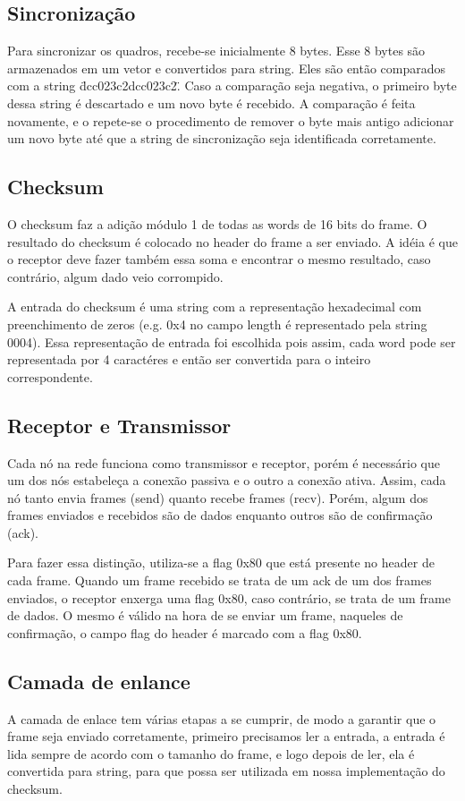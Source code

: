 \documentclass[a4paper,10pt]{article}
\begin{document}
\subsection{Sincronização}
  Para sincronizar os quadros, recebe-se inicialmente 8 bytes. Esse 8 bytes
  são armazenados em um vetor e convertidos para string. Eles são então
  comparados com a string \"dcc023c2dcc023c2\". Caso a comparação seja
  negativa, o primeiro byte dessa string é descartado e um novo byte é
  recebido. A comparação é feita novamente, e o repete-se o procedimento de
  remover o byte mais antigo adicionar um novo byte até que a string de
  sincronização seja identificada corretamente.

\subsection{Checksum}
  O checksum faz a adição módulo 1 de todas as words de 16 bits do frame.
  O resultado do checksum é colocado no header do frame a ser enviado.
  A idéia é que o receptor deve fazer também essa soma e encontrar o mesmo
  resultado, caso contrário, algum dado veio corrompido.

  A entrada do checksum é uma string com a representação hexadecimal com
  preenchimento de zeros (e.g. 0x4 no campo length é representado pela string
  0004). Essa representação de entrada foi escolhida pois assim, cada word
  pode ser representada por 4 caractéres e então ser convertida para o inteiro
  correspondente.

\subsection{Receptor e Transmissor}
  Cada nó na rede funciona como transmissor e receptor, porém é necessário que
  um dos nós estabeleça a conexão passiva e o outro a conexão ativa. Assim,
  cada nó tanto envia frames (send) quanto recebe frames (recv). Porém,
  algum dos frames enviados e recebidos são de dados enquanto outros são
  de confirmação (ack).

  Para fazer essa distinção, utiliza-se a flag 0x80 que está presente no
  header de cada frame. Quando um frame recebido se trata de um ack de
  um dos frames enviados, o receptor enxerga uma flag 0x80, caso contrário,
  se trata de um frame de dados. O mesmo é válido na hora de se enviar um
  frame, naqueles de confirmação, o campo flag do header é marcado com a flag
  0x80.

\subsection{Camada de enlance}
  A camada de enlace tem várias etapas a se cumprir, de modo a garantir que
  o frame seja enviado corretamente, primeiro precisamos ler a entrada, a
  entrada é lida sempre de acordo com o tamanho do frame,
  e logo depois de ler, ela é convertida para string, para que possa ser
  utilizada em nossa implementação do checksum.
\end{document}
